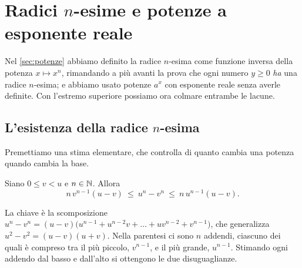 \section{Radici \texorpdfstring{$n$}{n}-esime e potenze a esponente reale}
\label{sec:esponenziale-reale}

Nel \cref{sec:potenze} abbiamo definito la radice $n$-esima come funzione inversa della
potenza $x\mapsto x^{n}$, rimandando a più avanti la prova che ogni numero $y\ge0$
\emph{ha} una radice $n$-esima; e abbiamo usato potenze $a^{x}$ con esponente reale senza
averle definite. Con l'estremo superiore possiamo ora colmare entrambe le lacune.

\subsection{L'esistenza della radice \texorpdfstring{$n$}{n}-esima}

Premettiamo una stima elementare, che controlla di quanto cambia una potenza quando
cambia la base.

\begin{lemma}\label{lem:stima-potenze}
Siano $0\le v<u$ e $n\in\mathbb{N}$. Allora
\begin{equation}\label{eq:stima-potenze}
  n\,v^{n-1}(u-v)\ \le\ u^{n}-v^{n}\ \le\ n\,u^{n-1}(u-v).
\end{equation}
\end{lemma}

\begin{schema}
\end{schema}

\begin{strategia}
La chiave è la scomposizione
$u^{n}-v^{n}=(u-v)\bigl(u^{n-1}+u^{n-2}v+\dots+uv^{n-2}+v^{n-1}\bigr)$, che generalizza
$u^{2}-v^{2}=(u-v)(u+v)$. Nella parentesi ci sono $n$ addendi, ciascuno dei quali è
compreso tra il più piccolo, $v^{n-1}$, e il più grande, $u^{n-1}$. Stimando ogni
addendo dal basso e dall'alto si ottengono le due disuguaglianze.
\end{strategia}

